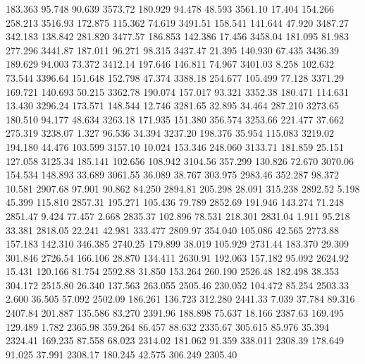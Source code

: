  183.363   95.748   90.639      3573.72
 180.929   94.478   48.593      3561.10
  17.404  154.266  258.213      3516.93
 172.875  115.362   74.619      3491.51
 158.541  141.644   47.920      3487.27
 342.183  138.842  281.820      3477.57
 186.853  142.386   17.456      3458.04
 181.095   81.983  277.296      3441.87
 187.011   96.271   98.315      3437.47
  21.395  140.930   67.435      3436.39
 189.629   94.003   73.372      3412.14
 197.646  146.811   74.967      3401.03
   8.258  102.632   73.544      3396.64
 151.648  152.798   47.374      3388.18
 254.677  105.499   77.128      3371.29
 169.721  140.693   50.215      3362.78
 190.074  157.017   93.321      3352.38
 180.471  114.631   13.430      3296.24
 173.571  148.544   12.746      3281.65
  32.895   34.464  287.210      3273.65
 180.510   94.177   48.634      3263.18
 171.935  151.380  356.574      3253.66
 221.477   37.662  275.319      3238.07
   1.327   96.536   34.394      3237.20
 198.376   35.954  115.083      3219.02
 194.180   44.476  103.599      3157.10
  10.024  153.346  248.060      3133.71
 181.859   25.151  127.058      3125.34
 185.141  102.656  108.942      3104.56
 357.299  130.826   72.670      3070.06
 154.534  148.893   33.689      3061.55
  36.089   38.767  303.975      2983.46
 352.287   98.372   10.581      2907.68
  97.901   90.862   84.250      2894.81
 205.298   28.091  315.238      2892.52
   5.198   45.399  115.810      2857.31
 195.271  105.436   79.789      2852.69
 191.946  143.274   71.248      2851.47
   9.424   77.457    2.668      2835.37
 102.896   78.531  218.301      2831.04
   1.911   95.218   33.381      2818.05
  22.241   42.981  333.477      2809.97
 354.040  105.086   42.565      2773.88
 157.183  142.310  346.385      2740.25
 179.899   38.019  105.929      2731.44
 183.370   29.309  301.846      2726.54
 166.106   28.870  134.411      2630.91
 192.063  157.182   95.092      2624.92
  15.431  120.166   81.754      2592.88
  31.850  153.264  260.190      2526.48
 182.498   38.353  304.172      2515.80
  26.340  137.563  263.055      2505.46
 230.052  104.472   85.254      2503.33
   2.600   36.505   57.092      2502.09
 186.261  136.723  312.280      2441.33
   7.039   37.784   89.316      2407.84
 201.887  135.586   83.270      2391.96
 188.898   75.637   18.166      2387.63
 169.495  129.489    1.782      2365.98
 359.264   86.457   88.632      2335.67
 305.615   85.976   35.394      2324.41
 169.235   87.558   68.023      2314.02
 181.062   91.359  338.011      2308.39
 178.649   91.025   37.991      2308.17
 180.245   42.575  306.249      2305.40

